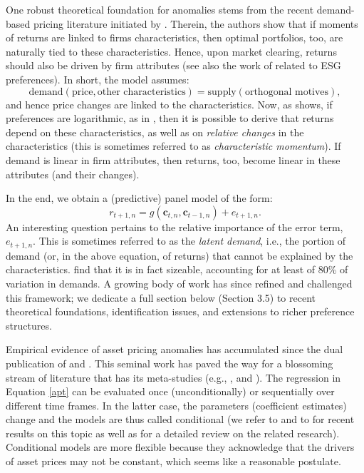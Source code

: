 One robust theoretical foundation for anomalies stems from the recent demand-based pricing literature initiated by \cite{koijen2019demand}. Therein, the authors show that if moments of returns are linked to firms characteristics, then optimal portfolios, too, are naturally tied to these characteristics. Hence, upon market clearing, returns should also be driven by firm attributes (see also the work of \cite{van2026flow} related to ESG preferences). In short, the model assumes:
\begin{equation}
\text{demand}(\text{price},\text{other characteristics}) = \text{supply}(\text{orthogonal motives}) ,
\end{equation}
and hence price changes are linked to the characteristics. Now, as \cite{coqueret2022characteristics} shows, if preferences are logarithmic, as in \cite{koijen2019demand}, then it is possible to derive that returns depend on these characteristics, as well as on \textit{relative changes} in the characteristics (this is sometimes referred to as \textit{characteristic momentum}). If demand is linear in firm attributes, then returns, too, become linear in these attributes (and their changes).

In the end, we obtain a (predictive) panel model of the form:
\begin{equation}
r_{t+1,n}=g(\textbf{c}_{t,n}, \textbf{c}_{t-1,n}) + e_{t+1, n}.
\end{equation}
An interesting question pertains to the relative importance of the error term, $e_{t+1,n}$. This is sometimes referred to as the \textit{latent demand}, i.e., the portion of demand (or, in the above equation, of returns) that cannot be explained by the characteristics. \cite{koijen2019demand} find that it is in fact sizeable, accounting for at least of 80\% of variation in demands. A growing body of work has since refined and challenged this framework; we dedicate a full section below (Section 3.5) to recent theoretical foundations, identification issues, and extensions to richer preference structures.

Empirical evidence of asset pricing anomalies has accumulated since the dual publication of \cite{fama1992cross} and \cite{fama1993common}. This seminal work has paved the way for a blossoming stream of literature that has its meta-studies (e.g., \cite{green2013supraview}, \cite{harvey2016and} and \cite{mclean2016does}). The regression in Equation \ref{apt} can be evaluated once (unconditionally) or sequentially over different time frames. In the latter case, the parameters (coefficient estimates) change and the models are thus called conditional (we refer to \cite{ang2012testing} and to \cite{cooper2018new} for recent results on this topic as well as for a detailed review on the related research). Conditional models are more flexible because they acknowledge that the drivers of asset prices may not be constant, which seems like a reasonable postulate.

